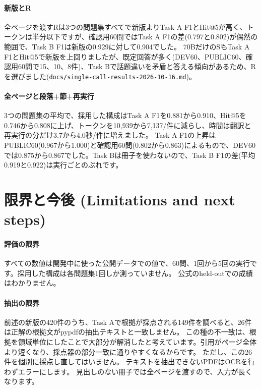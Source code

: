 \documentclass[10pt,a4paper]{ltjsarticle}
\begin{document}
\paragraph{新版とR}
全ページを渡すRは3つの問題集すべてで新版よりTask A F1とHit@5が高く、トークンは半分以下ですが、確認用60問ではTask A F1の差(0.797と0.802)が偶然の範囲で、Task B F1は新版の0.929に対して0.904でした。
70BだけのSもTask A F1とHit@5で新版を上回りましたが、既定回答が多く(DEV60、PUBLIC60、確認用60問で15、10、8件)、Task Bで話題違いを矛盾と答える傾向があるため、Rを選びました(\texttt{docs/single-call-results-2026-10-16.md})。

\paragraph{全ページと段落+節+再実行}
3つの問題集の平均で、採用した構成はTask A F1を0.881から0.910、Hit@5を0.746から0.808に上げ、トークンを10,939から7,137/件に減らし、時間は翻訳と再実行の分だけ3.7から4.0秒/件に増えました。
Task A F1の上昇はPUBLIC60(0.967から1.000)と確認用60問(0.802から0.863)によるもので、DEV60では0.875から0.867でした。Task Bは冊子を使わないので、Task B F1の差(平均0.919と0.922)は実行ごとのぶれです。

\section{限界と今後 (Limitations and next steps)}

\paragraph{評価の限界}
すべての数値は開発中に使った公開データでの値で、60問、1回から5回の実行です。採用した構成は各問題集1回しか測っていません。
公式のheld-outでの成績はわかりません。

\paragraph{抽出の限界}
前述の新版の420件のうち、Task Aで根拠が採点される149件を調べると、26件は正解の根拠文がpypdfの抽出テキストと一致しません。
この種の不一致は、根拠を領域単位にしたことで大部分が解消したと考えています。引用がページ全体より短くなり、採点器の部分一致に通りやすくなるからです。
ただし、この26件を個別に採点し直してはいません。
テキストを抽出できないPDFはOCRを行わずエラーにします。
見出しのない冊子では全ページを渡すので、入力が長くなります。
\end{document}
